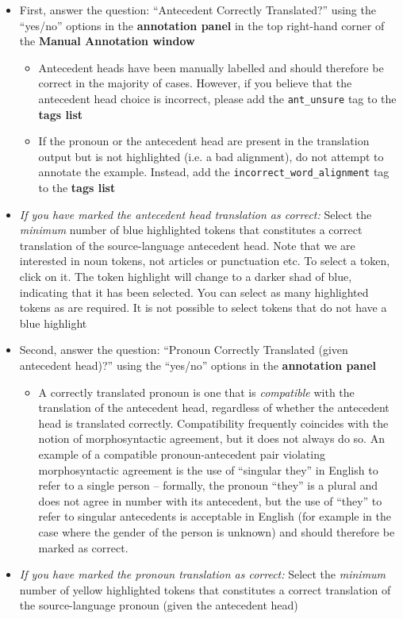 \documentclass[11pt]{article} %
\newcommand\tag[1]{\texttt{#1}}
\begin{document}
\begin{itemize}
  \item First, answer the question: ``Antecedent Correctly Translated?'' using the ``yes/no'' options in the \textbf{annotation panel} in the top right-hand corner of the \textbf{Manual Annotation window}
  \begin{itemize}
    \item Antecedent heads have been manually labelled and should therefore be correct in the majority of cases. However, if you believe that the antecedent head choice is incorrect, please add the \tag{ant\_unsure} tag to the \textbf{tags list}
    \item If the pronoun or the antecedent head are present in the translation output but is not highlighted (i.e. a bad alignment), do not attempt to annotate the example. Instead, add the \tag{incorrect\_word\_alignment} tag to the \textbf{tags list}
  \end{itemize}  
  \item \textit{If you have marked the antecedent head translation as correct:} Select the \textit{minimum} number of blue highlighted tokens that constitutes a correct translation of the source-language antecedent head. Note that we are interested in noun tokens, not articles or punctuation etc. To select a token, click on it. The token highlight will change to a darker shad of blue, indicating that it has been selected. You can select as many highlighted tokens as are required. It is not possible to select tokens that do not have a blue highlight
  \item Second, answer the question: ``Pronoun Correctly Translated (given antecedent head)?'' using the ``yes/no'' options in the \textbf{annotation panel}
  \begin{itemize}
    \item A correctly translated pronoun is one that is \textit{compatible}
	    with the translation of the antecedent head, regardless of whether
	    the antecedent head is translated correctly. Compatibility
	    frequently coincides with the notion of morphosyntactic agreement,
	    but it does not always do so. An example of a compatible
	    pronoun-antecedent pair violating morphosyntactic agreement is the
	    use of ``singular they'' in English to refer to a single person --
	    formally, the pronoun ``they'' is a plural and does not agree in
	    number with its antecedent, but the use of ``they'' to refer to
	    singular antecedents is acceptable in English (for example in the
	    case where the gender of the person is unknown) and should
	    therefore be marked as correct.
  \end{itemize}
  \item \textit{If you have marked the pronoun translation as correct:} Select the \textit{minimum} number of yellow highlighted tokens that constitutes a correct translation of the source-language pronoun (given the antecedent head)
\end{itemize}
\end{document}
